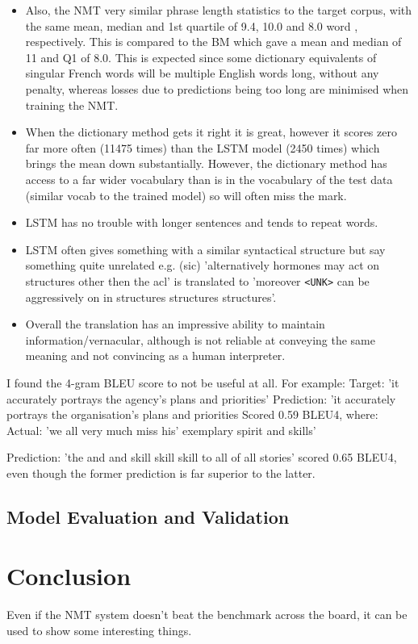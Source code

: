 \documentclass[]{article}
\begin{document}
\begin{itemize}
	\item Also, the NMT very similar phrase length statistics to the target corpus, with the same mean, median and 1st quartile of 9.4, 10.0 and  8.0 word , respectively. This is compared to the BM which gave a mean and median of 11 and Q1 of 8.0. This is expected since some dictionary equivalents of singular French words will be multiple English words long, without any penalty, whereas losses due to predictions being too long are minimised when training the NMT.
	\item When the dictionary method gets it right it is great, however it scores zero far more often (11475 times) than the LSTM model (2450 times) which brings the mean down substantially. However, the dictionary method has access to a far wider vocabulary than is in the vocabulary of the test data (similar vocab to the trained model) so will often miss the mark.
	\item LSTM has no trouble with longer sentences and tends to repeat words.
	\item LSTM often gives something with a similar syntactical structure but say something quite unrelated e.g. (sic) 'alternatively hormones may act on structures other then the acl' is translated to 'moreover \lstinline{<UNK>} can be aggressively on in structures structures structures'.
	\item Overall the translation has an impressive ability to maintain information/vernacular, although is not reliable at conveying the same meaning and not convincing as a human interpreter.
\end{itemize}
I found the 4-gram BLEU score to not be useful at all. For example: 
Target: 'it accurately portrays the agency's plans and priorities'
Prediction: 'it accurately portrays the organisation's plans and priorities
Scored 0.59 BLEU4, where:
Actual: 'we all very much miss his' exemplary spirit and skills'

Prediction: 'the and and skill skill skill to all of all stories'
scored 0.65 BLEU4, even though the former prediction is far superior to the latter.
\subsection{Model Evaluation and Validation}

\section{Conclusion}
Even if the NMT system doesn't beat the benchmark across the board, it can be used to show some interesting things.
\end{document}
